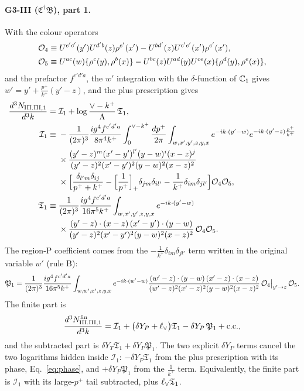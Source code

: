 \paragraph*{G3-III ($\mathfrak C^\dagger\mathfrak B$), part 1.} With the colour operators
\begin{align}
\mathcal{O}_4&\equiv U^{e'c'}(y')U^{d'b}(z)\rho^{e'}(x')-U^{bd'}(z)U^{c'e'}(x')\rho^{e'}(x'),\notag\\
\mathcal{O}_5&\equiv U^{ac}(w)\{\rho^c(y),\rho^b(x)\}-U^{bc}(z)U^{ad}(y)U^{ce}(x)\{\rho^d(y),\rho^e(x)\},
\end{align}
and the prefactor $f^{c'd'a}$, the $w'$ integration with the $\delta$-function of $\mathbb{C}_1$ gives $w'=y'+\frac{p^+}{k^+}(y'-z)$, and the plus prescription gives
\begin{align}
\frac{d^3N_{\rm III.III,1}}{d^3k}={}&\mathcal I_1+\log\frac{\vee-k^+}{\Lambda}\,\mathfrak T_1,\notag\\
\mathcal I_1\equiv{}&-\frac{1}{(2\pi)^3}\frac{ig^4f^{c'd'a}}{8\pi^4k^+}\int_0^{\vee-k^+}\frac{dp^+}{2\pi}\int_{w,x',y',z,y,x}e^{-ik\cdot(y'-w)}e^{-ik\cdot(y'-z)\frac{p^+}{k^+}}\notag\\
&\times\frac{(y'-z)^m(x'-y')^{l'}(y-w)^i(x-z)^j}{(y'-z)^2(x'-y')^2(y-w)^2(x-z)^2}\notag\\
&\times\Big[\frac{\delta_{l'm}\delta_{ij}}{p^++k^+}-\Big[\frac{1}{p^+}\Big]_+\delta_{jm}\delta_{il'}-\frac{1}{k^+}\delta_{im}\delta_{jl'}\Big]\mathcal{O}_4\mathcal{O}_5,\notag\\
\mathfrak T_1\equiv{}&\frac{1}{(2\pi)^3}\frac{ig^4f^{c'd'a}}{16\pi^5k^+}\int_{w,x',y',z,y,x}e^{-ik\cdot(y'-w)}\notag\\
&\times\frac{(y'-z)\cdot(x-z)\,(x'-y')\cdot(y-w)}{(y'-z)^2(x'-y')^2(y-w)^2(x-z)^2}\,\mathcal{O}_4\mathcal{O}_5.
\label{eq:GIIIIII1}
\end{align}
The region-P coefficient comes from the $-\frac{1}{k^+}\delta_{im}\delta_{jl'}$ term written in the original variable $w'$ (rule B):
\begin{equation}
\mathfrak P_1=\frac{1}{(2\pi)^3}\frac{ig^4f^{c'd'a}}{16\pi^5k^+}\int_{w,w',x',z,y,x}e^{-ik\cdot(w'-w)}\frac{(w'-z)\cdot(y-w)\,(x'-z)\cdot(x-z)}{(w'-z)^2(x'-z)^2(y-w)^2(x-z)^2}\,\mathcal{O}_4\big|_{y'\to z}\,\mathcal{O}_5.
\end{equation}
The finite part is
\begin{equation}
\frac{d^3N^{\rm fin}_{\rm III.III,1}}{d^3k}=\mathcal I_1+\big(\delta Y_P+\ell_{\vee}\big)\mathfrak T_1-\delta Y_P\,\mathfrak P_1+{\rm c.c.},
\label{eq:finGIIIIII1}
\end{equation}
and the subtracted part is $\delta Y_T\mathfrak T_1+\delta Y_P\mathfrak P_1$. The two explicit $\delta Y_P$ terms cancel the two logarithms hidden inside $\mathcal I_1$: $-\delta Y_P\mathfrak T_1$ from the plus prescription with its phase, Eq.~\eqref{eq:phase}, and $+\delta Y_P\mathfrak P_1$ from the $\frac{1}{k^+}$ term. Equivalently, the finite part is $\mathcal I_1$ with its large-$p^+$ tail subtracted, plus $\ell_{\vee}\mathfrak T_1$.

